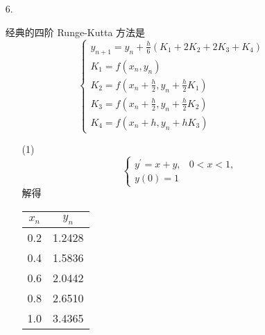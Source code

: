 \documentclass{sjtuarticle}
\begin{document}
\begin{itemize}
    \item[6.] \begin{solution}
        经典的四阶 Runge-Kutta 方法是
        \begin{equation*}
            \begin{cases}
                y_{n+1}=y_n+\frac{h}{6}(K_1+2K_2+2K_3+K_4)\\
                K_1=f(x_n,y_n)\\
                K_2=f(x_n+\frac{h}{2},y_n+\frac{h}{2}K_1)\\
                K_3=f(x_n+\frac{h}{2},y_n+\frac{h}{2}K_2)\\
                K_4=f(x_n+h,y_n+hK_3)
            \end{cases}
        \end{equation*}
        \begin{itemize}
            \item[(1)] \begin{equation*}
                \begin{cases}
                    y^\prime =x+y, & 0<x<1,\\
                    y(0)=1
                \end{cases}
            \end{equation*}
            解得
            \begin{table}[h]
                \centering
                \begin{tabular}{cc}
                    \toprule
                    $x_n$ & $y_n$ \\
                    \midrule
                    0.2 & 1.2428 \\
                    0.4 & 1.5836 \\
                    0.6 & 2.0442 \\
                    0.8 & 2.6510 \\
                    1.0 & 3.4365 \\
                    \bottomrule
                \end{tabular}
            \end{table}


\end{itemize}
\end{solution}
\end{itemize}
\end{document}
